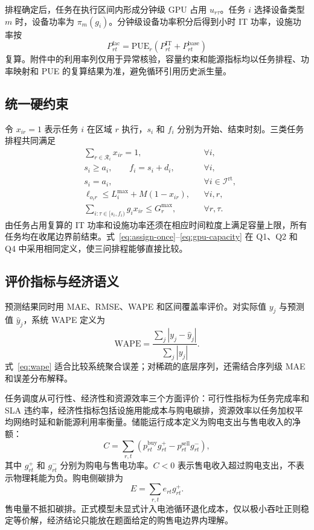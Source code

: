 排程确定后，任务在执行区间内形成分钟级 GPU 占用 $u_{r\tau}$。任务 $i$ 选择设备类型 $m$ 时，设备功率为 $\pi_m(g_i)$。分钟级设备功率积分后得到小时 IT 功率，设施功率按
\begin{equation}
  P^{\mathrm{fac}}_{rt}=\mathrm{PUE}_r\left(P^{\mathrm{IT}}_{rt}+P^{\mathrm{base}}_{rt}\right)
  \label{eq:facility-power}
\end{equation}
复算。附件中的利用率列仅用于异常核验，容量约束和能源指标均以任务排程、功率映射和 PUE 的复算结果为准，避免循环引用历史派生量。

\subsection{统一硬约束}

令 $x_{ir}=1$ 表示任务 $i$ 在区域 $r$ 执行，$s_i$ 和 $f_i$ 分别为开始、结束时刻。三类任务排程共同满足
\begin{align}
  &\sum_{r\in\mathcal R_i}x_{ir}=1, &&\forall i, \label{eq:assign-once}\\
  &s_i\ge a_i,\qquad f_i=s_i+d_i, &&\forall i, \label{eq:release}\\
  &s_i=a_i, &&\forall i\in\mathcal I^{\mathrm{rt}}, \label{eq:realtime}\\
  &\ell_{o_i r}\le L_i^{\max}+M(1-x_{ir}), &&\forall i,r, \label{eq:latency}\\
  &\sum_{i:\tau\in[s_i,f_i)}g_i x_{ir}\le G_r^{\max}, &&\forall r,\tau. \label{eq:gpu-capacity}
\end{align}
由任务占用复算的 IT 功率和设施功率还须在相应时间粒度上满足容量上限，所有任务均在收尾边界前结束。式~\eqref{eq:assign-once}--\eqref{eq:gpu-capacity} 在 Q1、Q2 和 Q4 中采用相同定义，使三问排程能够直接比较。

\subsection{评价指标与经济语义}

预测结果同时用 MAE、RMSE、WAPE 和区间覆盖率评价。对实际值 $y_j$ 与预测值 $\hat y_j$，系统 WAPE 定义为
\begin{equation}
  \mathrm{WAPE}=\frac{\sum_j|y_j-\hat y_j|}{\sum_j|y_j|}.
  \label{eq:wape}
\end{equation}
式~\eqref{eq:wape} 适合比较系统聚合误差；对稀疏的底层序列，还需结合序列级 MAE 和误差分布解释。

任务调度从可行性、经济性和资源效率三个方面评价：可行性指标为任务完成率和 SLA 违约率，经济性指标包括设施用能成本与购电碳排，资源效率以任务加权平均网络时延和新能源利用率衡量。储能运行成本定义为购电支出与售电收入的净额：
\begin{equation}
  C=\sum_{r,t}\left(p^{\mathrm{buy}}_{rt}g^+_{rt}-p^{\mathrm{sell}}_{rt}g^-_{rt}\right),
  \label{eq:net-cost}
\end{equation}
其中 $g^+_{rt}$ 和 $g^-_{rt}$ 分别为购电与售电功率。$C<0$ 表示售电收入超过购电支出，不表示物理耗能为负。购电侧碳排为
\begin{equation}
  E=\sum_{r,t}e_{rt}g^+_{rt}.
  \label{eq:grid-carbon}
\end{equation}
售电量不抵扣碳排。正式模型未显式计入电池循环退化成本，仅以极小吞吐正则稳定等价解，经济结论只能放在题面给定的购售电边界内理解。

